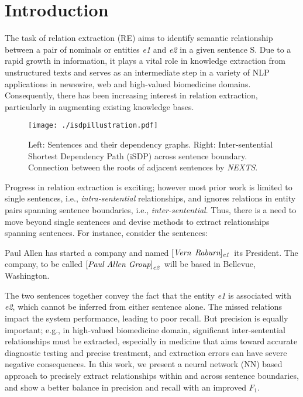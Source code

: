 \documentclass[letterpaper]{article} \usepackage{aaai19}  \usepackage{times}  \usepackage{helvet}  \usepackage{courier}  \usepackage{url}  \usepackage{graphicx}
\begin{document}
\section{Introduction}
\label{introduction}






The task of relation extraction (RE) aims to identify semantic relationship between a pair of nominals or entities \textit{e1} and \textit{e2} in a given sentence S. 
Due to a rapid growth in information, it plays a vital role in knowledge extraction from unstructured texts and serves as an intermediate 
step in a variety of NLP applications in  
newswire, web and high-valued biomedicine \cite{Bahcall:82} domains. 
Consequently, there has been increasing interest in relation extraction, particularly in augmenting existing knowledge bases.  


\begin{figure*}[t]
{
  \centering
   \texttt{[image: ./isdpillustration.pdf]}
    \caption{Left: Sentences and their dependency graphs. Right: Inter-sentential Shortest Dependency Path (iSDP) across sentence boundary. Connection between the roots of adjacent sentences by {\it NEXTS}.}
    \label{fig:sdp_illustration.}
}
\end{figure*}

Progress in relation extraction is exciting; however most  prior work \cite{zhang2006composite,kambhatla2004combining,vu2016combining,gupta2016table}  is limited to 
single sentences, i.e., {\it intra-sentential} relationships, and ignores relations in entity pairs spanning sentence boundaries, i.e., {\it inter-sentential}.  
Thus, there is a  need to move beyond single sentences and devise methods to extract relationships spanning sentences.  
For instance, consider the sentences:

{\small Paul Allen has started a company and named $\mbox{[{\it Vern}}$ $\mbox{\it Raburn}]_{\it e1}$ its President.
The company, to be called $\mbox{[{\it Paul Allen
Group}]}_{\it e2}$ will be based in Bellevue, Washington.} 

The two sentences together convey the fact that the entity
\emph{e1} is associated with \emph{e2}, which cannot be inferred from
either sentence alone.  The missed relations impact the
system performance, leading to poor recall.
But precision is equally important; e.g., 
in high-valued
biomedicine domain, 
significant inter-sentential
relationships must be extracted, especially in  medicine that aims
toward accurate diagnostic testing and precise treatment,
and extraction errors can have severe negative consequences. In
this work, we present a neural network (NN) based approach to
precisely extract relationships within and across sentence
boundaries, and show a better balance in precision and
recall with an improved $F_1$.
\end{document}
